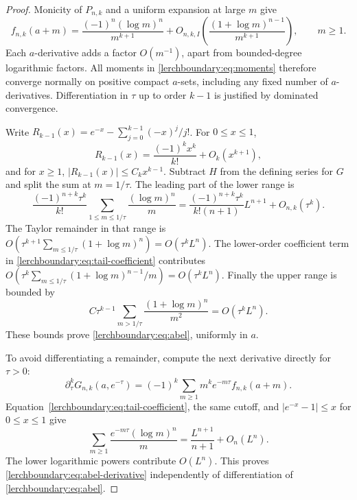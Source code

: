 \begin{proof}
Monicity of $P_{n,k}$ and a uniform expansion at large $m$ give
\begin{equation}\label{lerchboundary:eq:tail-coefficient}
 f_{n,k}(a+m)
 =\frac{(-1)^n(\log m)^n}{m^{k+1}}
 +O_{n,k,I}\left(\frac{(1+\log m)^{n-1}}{m^{k+1}}\right),
 \qquad m\geq1.
\end{equation}
Each $a$-derivative adds a factor $O(m^{-1})$, apart from bounded-degree
logarithmic factors.  All moments in \eqref{lerchboundary:eq:moments}
therefore converge normally on positive compact $a$-sets, including
any fixed number of $a$-derivatives. Differentiation in $\tau$ up to
order $k-1$ is justified by dominated convergence.

Write
$R_{k-1}(x)=e^{-x}-\sum_{j=0}^{k-1}(-x)^j/j!$. For $0\leq x\leq1$,
\[
 R_{k-1}(x)=\frac{(-1)^k x^k}{k!}+O_k(x^{k+1}),
\]
and for $x\geq1$, $|R_{k-1}(x)|\leq C_k x^{k-1}$.
Subtract $H$ from the defining series for $G$ and split the sum at
$m=1/\tau$. The leading part of the lower range is
\[
 \frac{(-1)^{n+k}\tau^k}{k!}
 \sum_{1\leq m\leq1/\tau}\frac{(\log m)^n}{m}
 =\frac{(-1)^{n+k}\tau^k}{k!(n+1)}L^{n+1}+O_{n,k}(\tau^k).
\]
The Taylor remainder in that range is
$O(\tau^{k+1}\sum_{m\leq1/\tau}(1+\log m)^n)
=O(\tau^k L^n)$.  The lower-order coefficient term in
\eqref{lerchboundary:eq:tail-coefficient} contributes
$O(\tau^k\sum_{m\leq1/\tau}(1+\log m)^{n-1}/m)
=O(\tau^kL^n)$. Finally the upper range is bounded by
\[
 C\tau^{k-1}\sum_{m>1/\tau}\frac{(1+\log m)^n}{m^2}
 =O(\tau^kL^n).
\]
These bounds prove \eqref{lerchboundary:eq:abel}, uniformly in $a$.

To avoid differentiating a remainder, compute the next derivative
directly for $\tau>0$:
\[
 \partial_\tau^kG_{n,k}(a,e^{-\tau})
 =(-1)^k\sum_{m\geq1}m^k e^{-m\tau}f_{n,k}(a+m).
\]
Equation~\eqref{lerchboundary:eq:tail-coefficient}, the same cutoff,
and $|e^{-x}-1|\leq x$ for $0\leq x\leq1$ give
\[
 \sum_{m\geq1}\frac{e^{-m\tau}(\log m)^n}{m}
 =\frac{L^{n+1}}{n+1}+O_n(L^n).
\]
The lower logarithmic powers contribute $O(L^n)$.
This proves \eqref{lerchboundary:eq:abel-derivative} independently
of differentiation of \eqref{lerchboundary:eq:abel}.
\end{proof}

